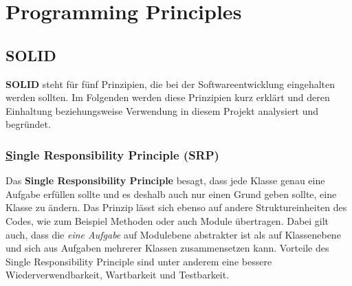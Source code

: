 \chapter{Programming Principles}

\section{SOLID}

\textbf{SOLID} steht für fünf Prinzipien, die bei der Softwareentwicklung eingehalten werden sollten. 
Im Folgenden werden diese Prinzipien kurz erklärt und deren Einhaltung beziehungsweise Verwendung in diesem Projekt analysiert und begründet.


\subsection{\underline{S}ingle Responsibility Principle (SRP)}
\label{sec:SRP}

Das \textbf{Single Responsibility Principle} besagt, dass jede Klasse genau eine Aufgabe erfüllen sollte und es deshalb auch nur einen Grund geben sollte, eine Klasse zu ändern.
Das Prinzip lässt sich ebenso auf andere Struktureinheiten des Codes, wie zum Beispiel Methoden oder auch Module übertragen.
Dabei gilt auch, dass die \textit{eine Aufgabe} auf Modulebene abstrakter ist als auf Klassenebene und sich aus Aufgaben mehrerer Klassen zusammensetzen kann.
\newline
Vorteile des Single Responsibility Principle sind unter anderem eine bessere Wiederverwendbarkeit, Wartbarkeit  und Testbarkeit.

